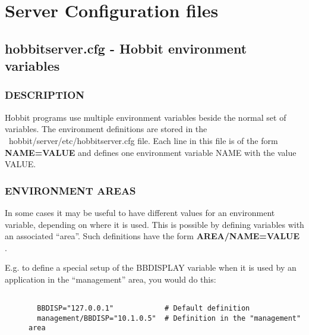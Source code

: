%
\chapter{Server Configuration files}

%

\section{ hobbitserver.cfg - Hobbit environment variables }
 
\subsection{DESCRIPTION}
 Hobbit programs use multiple environment variables beside the normal set of variables. The environment definitions are stored in the ~hobbit/server/etc/hobbitserver.cfg file. Each line in this file is of the form \textbf{NAME=VALUE}
 and defines one environment variable NAME with the value VALUE. 

 
\subsection{ENVIRONMENT AREAS}
 In some cases it may be useful to have different values for an environment variable, depending on where it is used. This is possible by defining variables with an associated ``area''. Such definitions have the form \textbf{AREA/NAME=VALUE}
. 

  E.g. to define a special setup of the BBDISPLAY variable when it is used by an application in the ``management'' area, you would do this: \begin{description}
\item[]\begin{verbatim}

  BBDISP="127.0.0.1"            # Default definition
  management/BBDISP="10.1.0.5"  # Definition in the "management" area

\end{verbatim}


\end{description}



